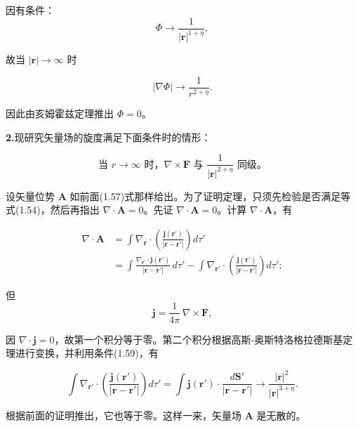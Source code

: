 \documentclass[11pt,a4paper,oneside]{ctexbook}
\newcommand{\ve}[1]{\bm{#1}}
\begin{document}
因有条件：
\begin{equation*}
\Phi \longrightarrow \frac{1}{|\ve{r}|^{1+\eta}},
\end{equation*}

故当 $|\ve{r}| \to \infty$ 时

\begin{equation*}
|\nabla\Phi| \longrightarrow \frac{1}{r^{2+\eta}}.
\end{equation*}

因此由亥姆霍兹定理推出 $\Phi = 0$。

\textbf{2.}\quad 现研究矢量场的旋度满足下面条件时的情形：

\begin{equation}
\text{当 } r \to \infty \text{ 时，} \nabla \times \ve{F} \text{ 与 } \frac{1}{|\ve{r}|^{2+\eta}} \text{ 同级。}
\tag{1.59}
\end{equation}

设矢量位势 $\ve{A}$ 如前面(1.57)式那样给出。为了证明定理，只须先检验是否满足等式(1.54)，然后再指出 $\nabla \cdot \ve{A} = 0$。先证 $\nabla \cdot \ve{A} = 0$。计算 $\nabla \cdot \ve{A}$，有

\begin{equation*}
\begin{aligned}
\nabla \cdot \ve{A} &= \int \nabla_{\ve{r}} \cdot \left(\frac{\ve{j}(\ve{r}')}{|\ve{r} - \ve{r}'|}\right) d\tau'\\
&= \int \frac{\nabla_{\ve{r}'} \cdot \ve{j}(\ve{r}')}{|\ve{r} - \ve{r}'|}\, d\tau' - \int \nabla_{\ve{r}'} \cdot \left(\frac{\ve{j}(\ve{r}')}{|\ve{r} - \ve{r}'|}\right) d\tau';
\end{aligned}
\end{equation*}

但
\begin{equation*}
\ve{j} = \frac{1}{4\pi}\, \nabla \times \ve{F},
\end{equation*}

因 $\nabla \cdot \ve{j} = 0$，故第一个积分等于零。第二个积分根据高斯-奥斯特洛格拉德斯基定理进行变换，并利用条件(1.59)，有

\begin{equation*}
\int \nabla_{\ve{r}'} \cdot \left(\frac{\ve{j}(\ve{r}')}{|\ve{r} - \ve{r}'|}\right) d\tau' = \int \ve{j}(\ve{r}') \cdot \frac{d\ve{S}'}{|\ve{r} - \ve{r}'|} \longrightarrow \frac{|\ve{r}|^{2}}{|\ve{r}|^{3+\eta}}.
\end{equation*}

根据前面的证明推出，它也等于零。这样一来，矢量场 $\ve{A}$ 是无散的。
\end{document}
